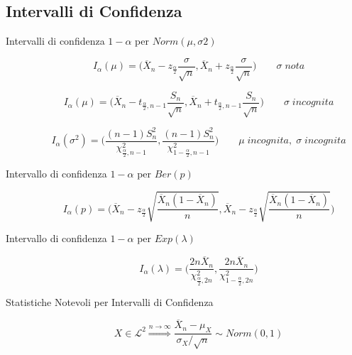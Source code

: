 \subsection{Intervalli di Confidenza}

\begin{description}
	
	\item[Intervalli di confidenza $1-\alpha$ per $Norm(\mu,\sigma{2})$]
		\begin{equation}
		I_{\alpha}(\mu)= \Big(\overline{X}_{n}-z_{\frac{\alpha}{2}}\frac{\sigma}{\sqrt{n}},\overline{X}_{n}+z_{\frac{\alpha}{2}}\frac{\sigma}{\sqrt{n}}\Big)
		\qquad
		\sigma\;nota
		\end{equation}
	
		\begin{equation}
		I_{\alpha}(\mu)= \Big(\overline{X}_{n}-t_{\frac{\alpha}{2},n-1}\frac{S_{n}}{\sqrt{n}},\overline{X}_{n}+t_{\frac{\alpha}{2},n-1}\frac{S_{n}}{\sqrt{n}}\Big)
		\qquad
		\sigma\;incognita
		\end{equation}
		
		\begin{equation}
		I_{\alpha}(\sigma^{2})= \Big(\frac{(n-1)S_{n}^{2}}{\chi_{\frac{\alpha}{2},n-1}^{2}},
		\frac{(n-1)S_{n}^{2}}{\chi_{1-\frac{\alpha}{2},n-1}^{2}}\Big)
		\qquad
		\mu\;incognita,\;
		\sigma\;incognita
		\end{equation}
	
	\item[Intervallo di confidenza $1-\alpha$ per $Ber(p)$]
		\begin{equation}
		I_{\alpha}(p)=
		\Big(\overline{X}_{n}-z_{\frac{\alpha}{2}}\sqrt{\frac{\overline{X}_{n}(1-\overline{X}_{n})}{n}},\overline{X}_{n}-z_{\frac{\alpha}{2}}\sqrt{\frac{\overline{X}_{n}(1-\overline{X}_{n})}{n}}\Big)
		\end{equation}
	
	\item[Intervallo di confidenza $1-\alpha$ per $Exp(\lambda)$]
		\begin{equation}
		I_{\alpha}(\lambda)=
		\Big(\frac{2n\overline{X}_{n}}{\chi_{\frac{\alpha}{2},2n}^{2}},\frac{2n\overline{X}_{n}}{\chi_{1-\frac{\alpha}{2},2n}^{2}}\Big)
		\end{equation}
	
	\item[Statistiche Notevoli per Intervalli di Confidenza]
		\begin{equation}
		X\in\mathcal{L}^{2}
		\overset{n\rightarrow\infty}{\Rightarrow}
		\frac{\overline{X}_{n}-\mu_{X}}{\sigma_{X}/\sqrt{n}} \sim Norm(0,1)
		\end{equation}
		

\end{description}
